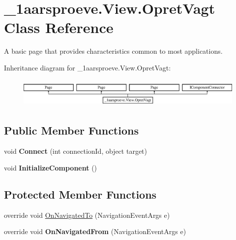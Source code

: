 \hypertarget{class__1aarsproeve_1_1_view_1_1_opret_vagt}{}\section{\+\_\+1aarsproeve.\+View.\+Opret\+Vagt Class Reference}
\label{class__1aarsproeve_1_1_view_1_1_opret_vagt}


A basic page that provides characteristics common to most applications.  


Inheritance diagram for \+\_\+1aarsproeve.\+View.\+Opret\+Vagt\+:\begin{figure}[H]
\begin{center}
\leavevmode
\includegraphics[height=1.450777cm]{class__1aarsproeve_1_1_view_1_1_opret_vagt}
\end{center}
\end{figure}
\subsection*{Public Member Functions}
\begin{DoxyCompactItemize}
\item 
\hypertarget{class__1aarsproeve_1_1_view_1_1_opret_vagt_a32f6f1d2b20a2a613647bf59c4fba582}{}void {\bfseries Connect} (int connection\+Id, object target)\label{class__1aarsproeve_1_1_view_1_1_opret_vagt_a32f6f1d2b20a2a613647bf59c4fba582}

\item 
\hypertarget{class__1aarsproeve_1_1_view_1_1_opret_vagt_a2c53ba2afdf89d829cf338652220e865}{}void {\bfseries Initialize\+Component} ()\label{class__1aarsproeve_1_1_view_1_1_opret_vagt_a2c53ba2afdf89d829cf338652220e865}

\end{DoxyCompactItemize}
\subsection*{Protected Member Functions}
\begin{DoxyCompactItemize}
\item 
override void \hyperlink{class__1aarsproeve_1_1_view_1_1_opret_vagt_a130f711b4eca04fe3eceb17b760f711b}{On\+Navigated\+To} (Navigation\+Event\+Args e)
\item 
\hypertarget{class__1aarsproeve_1_1_view_1_1_opret_vagt_a81ff62a8b1fdd64642bc7ed4354c0441}{}override void {\bfseries On\+Navigated\+From} (Navigation\+Event\+Args e)\label{class__1aarsproeve_1_1_view_1_1_opret_vagt_a81ff62a8b1fdd64642bc7ed4354c0441}

\end{DoxyCompactItemize}
